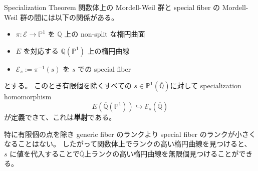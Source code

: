 \documentclass{classes/mybeamer}
\begin{document}
\begin{frame}{Specialization Theorem}
    関数体上の Mordell-Weil 群と special fiber の Mordell-Weil 群の間には以下の関係がある。
    \begin{thm}
        \label{thm:specialization}
        \begin{itemize}
            \item $\pi:\mathcal{E} \to \mathbb{P}^1$ を $\mathbb{Q}$ 上の non-split な楕円曲面
            \item $E$ を対応する $\mathbb{Q}(\mathbb{P}^1)$ 上の楕円曲線
            \item $\mathcal{E}_s:=\pi^{-1}(s)$ を $s$ での special fiber
        \end{itemize}
        とする。
        このとき有限個を除くすべての $s \in \mathbb{P}^1(\overline{\mathbb{Q}})$に対して specialization homomorphism
        \begin{equation*}
            E(\overline{\mathbb{Q}}(\mathbb{P}^1)) \hookrightarrow \mathcal{E}_{s}(\overline{\mathbb{Q}})
        \end{equation*}
        が定義できて、これは\textbf{単射}である。
    \end{thm}
    特に有限個の点を除き generic fiber のランクより special fiber のランクが小さくなることはない。
    したがって関数体上でランクの高い楕円曲線を見つけると、 $s$ に値を代入することで$\overline{\mathbb{Q}}$上ランクの高い楕円曲線を無限個見つけることができる。
\end{frame}
\end{document}
